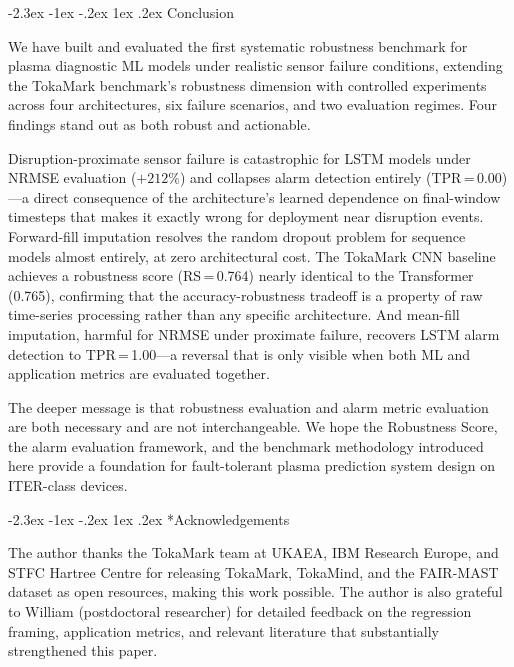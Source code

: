 \documentclass[10pt,twocolumn]{article}
\makeatletter
\renewcommand\section{\@startsection{section}{1}{\z@}%
  {-2.3ex \@plus -1ex \@minus -.2ex}%
  {1ex \@plus .2ex}%
  {\normalfont\Large\bfseries}}
\makeatother
\begin{document}
\section{Conclusion}

We have built and evaluated the first systematic robustness benchmark for
plasma diagnostic ML models under realistic sensor failure conditions,
extending the TokaMark benchmark's robustness dimension with controlled
experiments across four architectures, six failure scenarios, and two
evaluation regimes. Four findings stand out as both robust and actionable.

Disruption-proximate sensor failure is catastrophic for LSTM models under
NRMSE evaluation ($+212\%$) and collapses alarm detection entirely
(TPR\,=\,0.00)—a direct consequence of the architecture's learned
dependence on final-window timesteps that makes it exactly wrong for
deployment near disruption events. Forward-fill imputation resolves
the random dropout problem for sequence models almost entirely, at zero
architectural cost. The TokaMark CNN baseline achieves a robustness score
(RS\,=\,0.764) nearly identical to the Transformer (0.765), confirming
that the accuracy-robustness tradeoff is a property of raw time-series
processing rather than any specific architecture. And mean-fill
imputation, harmful for NRMSE under proximate failure, recovers LSTM
alarm detection to TPR\,=\,1.00—a reversal that is only visible when
both ML and application metrics are evaluated together.

The deeper message is that robustness evaluation and alarm metric
evaluation are both necessary and are not interchangeable. We hope the
Robustness Score, the alarm evaluation framework, and the benchmark
methodology introduced here provide a foundation for fault-tolerant
plasma prediction system design on ITER-class devices.

\section*{Acknowledgements}

The author thanks the TokaMark team at UKAEA, IBM Research Europe, and
STFC Hartree Centre for releasing TokaMark, TokaMind, and the FAIR-MAST
dataset as open resources, making this work possible. The author is also
grateful to William (postdoctoral researcher) for detailed feedback on
the regression framing, application metrics, and relevant literature
that substantially strengthened this paper.
\end{document}
